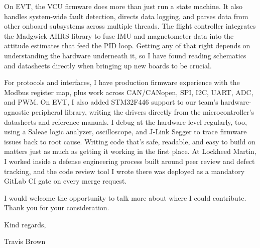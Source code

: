 \documentclass[11pt]{article}
\begin{document}
On EVT, the VCU firmware does more than just run a state machine. It also handles system-wide
fault detection, directs data logging, and parses data from other onboard
subsystems across multiple threads. The flight controller integrates the
Madgwick AHRS library to fuse IMU and magnetometer data into the attitude
estimates that feed the PID loop. Getting any of that right depends on understanding the
hardware underneath it, so I have found reading schematics and datasheets directly when
bringing up new boards to be crucial.

For protocols and interfaces, I have production firmware experience with
the Modbus register map, plus work across CAN/CANopen, SPI, I2C, UART,
ADC, and PWM. On EVT, I also added STM32F446 support to our team's
hardware-agnostic peripheral library, writing the drivers directly from the
microcontroller's datasheets and reference manuals. I debug at the
hardware level regularly, too, using a Saleae logic
analyzer, oscilloscope, and J-Link Segger to trace firmware issues back to
root cause. Writing code that's safe, readable, and easy to build on
matters just as much as getting it working in the first place. At
Lockheed Martin, I worked inside a defense engineering
process built around peer review and defect tracking, and the code review
tool I wrote there was deployed as a mandatory GitLab CI gate on every
merge request.

I would welcome the opportunity to talk more about where I could contribute.
Thank you for your consideration.

\vspace{16pt}
Kind regards,

\vspace{10pt}
Travis Brown
\end{document}
